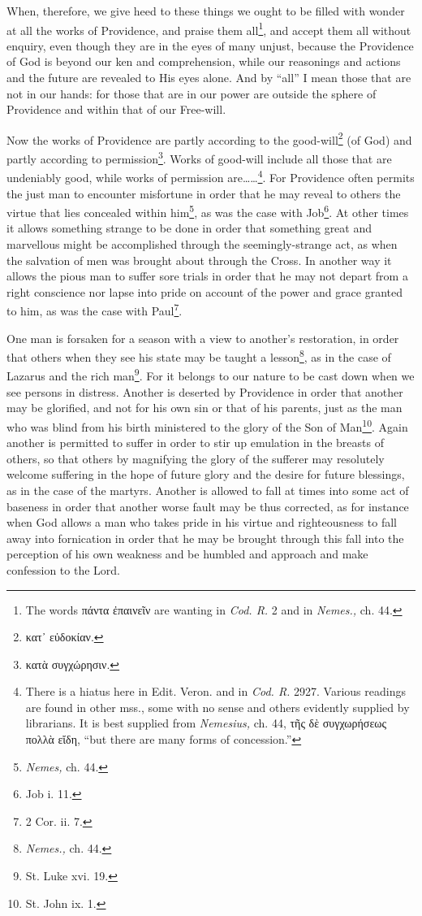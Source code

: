 When, therefore, we give heed to these things we ought to be filled with wonder at all the works of Providence, and praise them all\footnote{The words \textgreek{πάντα ἐπαινεῖν} are wanting in \emph{Cod. R. }2 and in \emph{Nemes., }ch. 44.}, and accept them all without enquiry, even though they are in the eyes of many unjust, because the Providence of God is beyond our ken and comprehension, while our reasonings and actions and the future are revealed to His eyes alone. And by “all” I mean those that are not in our hands: for those that are in our power are outside the sphere of Providence and within that of our Free-will.

Now the works of Providence are partly according to the good-will\footnote{\textgreek{κατ᾽ εὐδοκίαν}.} (of God) and partly according to permission\footnote{\textgreek{κατὰ συγχώρησιν}.}. Works of good-will include all those that are undeniably good, while works of permission are……\footnote{There is a hiatus here in Edit. Veron. and in \emph{Cod. R. }2927. Various readings are found in other mss., some with no sense and others evidently supplied by librarians. It is best supplied from \emph{Nemesius, }ch. 44, \textgreek{τῆς δὲ συγχωρήσεως πολλὰ εἴδη}, “but there are many forms of concession.”}. For Providence often permits the just man to encounter misfortune in order that he may reveal to others the virtue that lies concealed within him\footnote{\emph{Nemes, }ch. 44.}, as was the case with Job\footnote{Job i. 11.}. At other times it allows something strange to be done in order that something great and marvellous might be accomplished through the seemingly-strange act, as when the salvation of men was brought about through the Cross. In another way it allows the pious man to suffer sore trials in order that he may not depart from a right conscience nor lapse into pride on account of the power and grace granted to him, as was the case with Paul\footnote{2 Cor. ii. 7.}.

One man is forsaken for a season with a view to another’s restoration, in order that others when they see his state may be taught a lesson\footnote{\emph{Nemes.,} ch. 44.}, as in the case of Lazarus and the rich man\footnote{St. Luke xvi. 19.}. For it belongs to our nature to be cast down when we see persons in distress. Another is deserted by Providence in order that another may be glorified, and not for his own sin or that of his parents, just as the man who was blind from his birth ministered to the glory of the Son of Man\footnote{St. John ix. 1.}. Again another is permitted to suffer in order to stir up emulation in the breasts of others, so that others by magnifying the glory of the sufferer may resolutely welcome suffering in the hope of future glory and the desire for future blessings, as in the case of the martyrs. Another is allowed to fall at times into some act of baseness in order that another worse fault may be thus corrected, as for instance when God allows a man who takes pride in his virtue and righteousness to fall away into fornication in order that he may be brought through this fall into the perception of his own weakness and be humbled and approach and make confession to the Lord.

